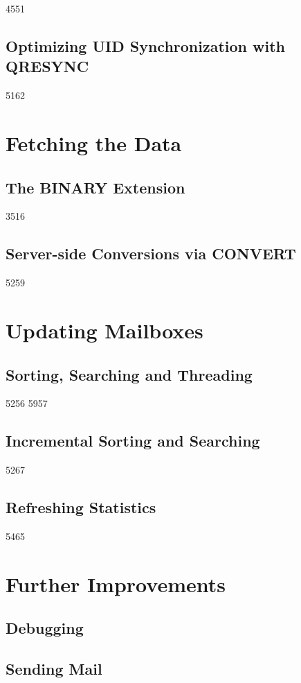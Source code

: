 \documentclass[trojita]{subfiles}
\begin{document}
4551

\subsection{Optimizing UID Synchronization with QRESYNC}

5162

\section{Fetching the Data}

\subsection{The BINARY Extension}

3516

\subsection{Server-side Conversions via CONVERT}

5259

\section{Updating Mailboxes}

\subsection{Sorting, Searching  and Threading}

5256
5957

\subsection{Incremental Sorting and Searching}

5267

\subsection{Refreshing Statistics}

5465

\section{Further Improvements}

\subsection{Debugging}

\subsection{Sending Mail}
\end{document}
